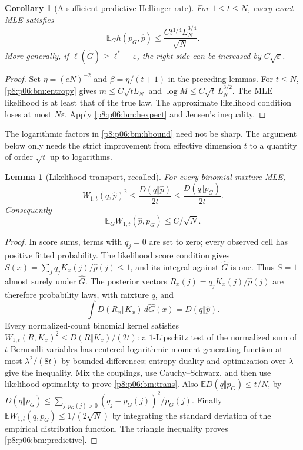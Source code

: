 \documentclass[11pt,a4paper]{article}
\newtheorem{lemma}[theorem]{Lemma}
\newtheorem{corollary}[theorem]{Corollary}
\theoremstyle{definition}
\theoremstyle{remark}
\numberwithin{equation}{section}
\begin{document}
\begin{corollary}[A sufficient predictive Hellinger rate]
\label{p8:p06:bm:hellinger}
For $1\le t\le N$, every exact MLE satisfies
\begin{equation}\label{p8:p06:bm:hbound}
 \mathbb E_G h(p_G,\widehat p)
       \le \frac{C t^{1/4}L_N^{3/4}}{\sqrt N}.
\end{equation}
More generally, if $\ell(\widetilde G)\ge\ell^*-\varepsilon$, the right
side can be increased by $C\sqrt\varepsilon$.
\end{corollary}
\begin{proof}
Set $\eta=(eN)^{-2}$ and $\beta=\eta/(t+1)$ in the preceding lemmas.
For $t\le N$, \eqref{p8:p06:bm:entropy} gives
$m\le C\sqrt{tL_N}$ and
$\log M\le C\sqrt t\,L_N^{3/2}$. The MLE likelihood is at least that of
the true law. The approximate likelihood condition loses at most
$N\varepsilon$. Apply \eqref{p8:p06:bm:hexpect} and Jensen's inequality.
\end{proof}

The logarithmic factors in \eqref{p8:p06:bm:hbound} need not be sharp. The
argument below only needs the strict improvement from effective dimension
$t$ to a quantity of order $\sqrt t$ up to logarithms.

\begin{lemma}[Likelihood transport, recalled]
\label{p8:p06:bm:transport}
For every binomial-mixture MLE,
\begin{equation}\label{p8:p06:bm:trans}
 W_{1,t}(q,\widehat p)^2\le\frac{D(q\Vert\widehat p)}{2t}
                    \le\frac{D(q\Vert p_G)}{2t}.
\end{equation}
Consequently
\begin{equation}\label{p8:p06:bm:predictive}
 \mathbb E_G W_{1,t}(\widehat p,p_G)\le C/\sqrt N.
\end{equation}
\end{lemma}
\begin{proof}
In score sums, terms with $q_j=0$ are set to zero; every observed
cell has positive fitted probability. The likelihood score condition gives
$S(x)=\sum_jq_jK_x(j)/\widehat p(j)\le1$, and its integral against
$\widehat G$ is one. Thus $S=1$ almost surely under $\widehat G$.
The posterior vectors $R_x(j)=q_jK_x(j)/\widehat p(j)$ are therefore
probability laws, with mixture $q$, and
\[
 \int D(R_x\Vert K_x)\,d\widehat G(x)=D(q\Vert\widehat p).
\]
Every normalized-count binomial kernel satisfies
$W_{1,t}(R,K_x)^2\le D(R\Vert K_x)/(2t)$: a $1$-Lipschitz test of the
normalized sum of $t$ Bernoulli variables has centered logarithmic moment
generating function at most $\lambda^2/(8t)$ by bounded differences;
entropy duality and optimization over $\lambda$ give the inequality.
Mix the couplings, use Cauchy--Schwarz, and then use likelihood optimality
to prove \eqref{p8:p06:bm:trans}. Also
$\mathbb E D(q\Vert p_G)\le t/N$, by
$D(q\Vert p_G)\le\sum_{j:p_G(j)>0}(q_j-p_G(j))^2/p_G(j)$.
Finally $\mathbb E W_{1,t}(q,p_G)\le1/(2\sqrt N)$ by integrating the
standard deviation of the empirical distribution function. The triangle
inequality proves \eqref{p8:p06:bm:predictive}.
\end{proof}
\end{document}
